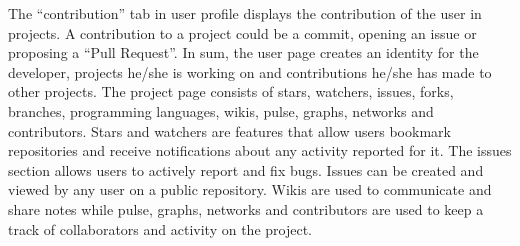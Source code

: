 The ``contribution'' tab in user profile displays the contribution of the user in projects. A contribution to a project could be a commit, opening an issue or proposing a ``Pull Request''. In sum, the user page creates an identity for the developer, projects he/she is working on and contributions he/she has made to other projects. The project page consists of stars, watchers, issues, forks, branches, programming languages, wikis, pulse, graphs, networks and contributors. Stars and watchers are features that allow users bookmark repositories and receive notifications about any activity reported for it. The issues section allows users to actively report and fix bugs. Issues can be created and viewed by any user on a public repository. Wikis are used to communicate and share notes while pulse, graphs, networks and contributors are used to keep a track of collaborators and activity on the project.

